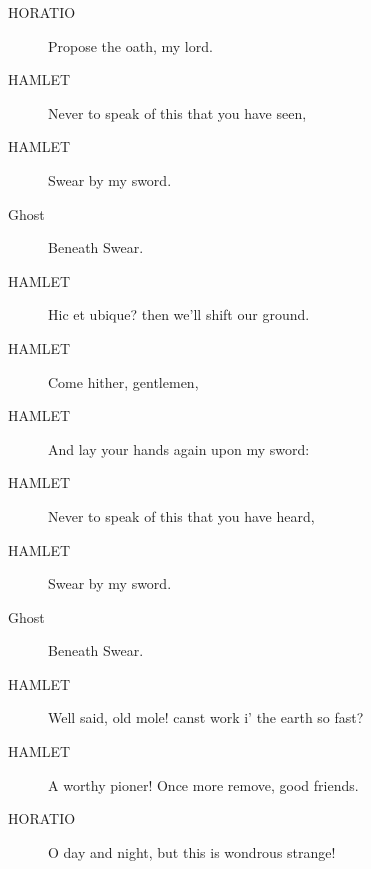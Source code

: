 \documentclass{article}
\begin{document}
\begin{description}
            
\item[HORATIO] Propose the oath, my lord.
\end{description}
          
\begin{description}
            
\item[HAMLET] Never to speak of this that you have seen,
\item[HAMLET] Swear by my sword.
\end{description}
          
\begin{description}
            
\item[Ghost] 
               Beneath  Swear.
\end{description}
          
\begin{description}
            
\item[HAMLET] Hic et ubique? then we'll shift our ground.
\item[HAMLET] Come hither, gentlemen,
\item[HAMLET] And lay your hands again upon my sword:
\item[HAMLET] Never to speak of this that you have heard,
\item[HAMLET] Swear by my sword.
\end{description}
          
\begin{description}
            
\item[Ghost] 
               Beneath  Swear.
\end{description}
          
\begin{description}
            
\item[HAMLET] Well said, old mole! canst work i' the earth so fast?
\item[HAMLET] A worthy pioner! Once more remove, good friends.
\end{description}
          
\begin{description}
            
\item[HORATIO] O day and night, but this is wondrous strange!
\end{description}
          
\end{document}

